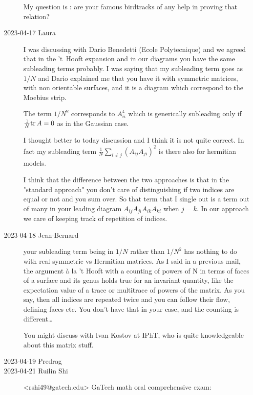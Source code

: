 \begin{description}
My question is : are your famous birdtracks of any help in proving that relation?

   \item[2023-04-17 Laura]
I was discussing with Dario Benedetti (Ecole Polytecnique) and we agreed that in the
't~Hooft expansion and in our diagrams you have the same subleading terms probably.
I was saying that my subleading term goes as $1/N$ and Dario explained
me that you have it with symmetric matrices, with non orientable surfaces,
and it is a diagram which correspond to the Moebius strip.

The term $1/N^2$ corresponds to $A_{ii}^4$ which is generically subleading only if\\
$\frac{1}{N}\mathrm{tr}\, A=0$ as in the Gaussian case.

I thought better to today discussion and I think it is not quite correct.
In fact my subleading term
$\frac{1}{N} \sum_{i \ne j} (A_{ij} A_{ji})^2$ is there also for hermitian models.

I think that the difference between the two approaches is that in the
"standard approach" you don't care of distinguishing if two indices are equal
or not and you sum over. So that term that I single out is a term out of many
in your leading diagram
$A_{ij} A_{ji} A_{ik} A_{ki}$ when $j=k$.
In our approach we care of keeping track of repetition of indices.

   \item[2023-04-18 Jean-Bernard]
your subleading term being in $1/N$ rather than $1/N^2$
has nothing to do with real symmetric vs Hermitian matrices.
As I said in a previous mail, the argument à la 't Hooft with a counting
of powers of N in terms of faces of a surface and its genus
holds true for an invariant quantity, like the expectation value of a
trace or multitrace of powers of the matrix. As you say, then all indices
are repeated twice and you can follow their flow, defining faces etc.
You don't have that in your case, and the counting is different…

You might discuss
with
{Ivan Kostov} at IPhT, who is quite knowledgeable about this matrix stuff.


   \item[2023-04-19 Predrag]

   \item[2023-04-21 Ruilin Shi]
 <rshi49@gatech.edu> GaTech math oral comprehensive exam:


\end{description}
